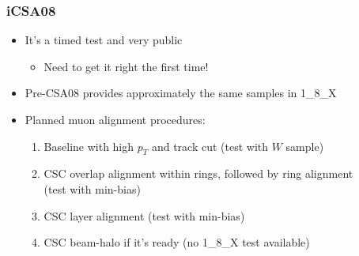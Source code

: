 \documentclass[compress]{beamer}
\begin{document}
\begin{frame}
\frametitle{iCSA08}

\begin{itemize}\setlength{\itemsep}{0.35 cm}
\item It's a timed test and very public
\begin{itemize}
\item Need to get it right the first time!
\end{itemize}
\item Pre-CSA08 provides approximately the same samples in 1\_8\_X
\item Planned muon alignment procedures:
\begin{enumerate}\setlength{\itemsep}{0.15 cm}
\item Baseline with high $p_T$ and track cut \hfill (test with $W$ sample)
\item CSC overlap alignment within rings, followed by ring alignment \\ \hfill (test with min-bias)
\item CSC layer alignment \hfill (test with min-bias)
\item CSC beam-halo if it's ready \hfill (no 1\_8\_X test available)
\end{enumerate}
\end{itemize}

\vfill
{}
\end{frame}
\end{document}
